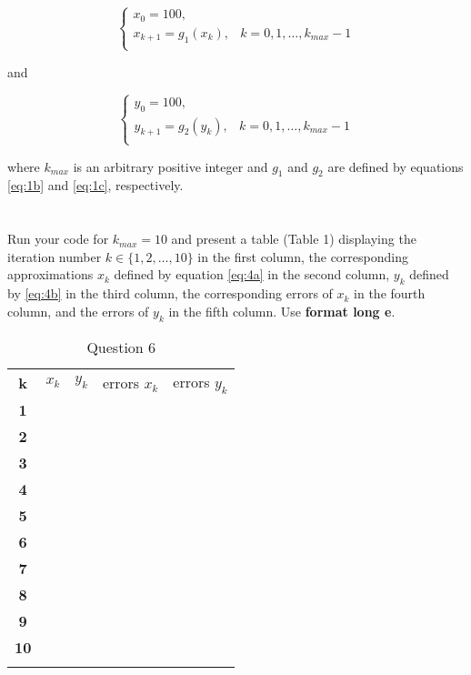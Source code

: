 \documentclass{article}
\begin{document}
\begin{equation}\label{eq:4a}
    \begin{cases}
    x_0 = 100,\\
    x_{k+1}= g_1(x_k), & k=0,1,\dots , k_{max}-1\\
    \end{cases}
\end{equation}

and 

\begin{equation}\label{eq:4b}
    \begin{cases}
    y_0 = 100,\\
    y_{k+1}= g_2(y_k), & k=0,1,\dots , k_{max}-1\\
    \end{cases}
\end{equation}

where $k_{max}$ is an arbitrary positive integer and $g_1$ and $g_2$ are defined by equations \ref{eq:1b} and \ref{eq:1c}, respectively. 

\vspace{10mm}

\section{}
Run your code for $k_{max}=10$ and present a table (Table 1) displaying the iteration number $k \in \{1,2,\dots,10\}$ in the first column, the corresponding approximations $x_k$ defined by equation \ref{eq:4a} in the second column, $y_k$ defined by \ref{eq:4b} in the third column, the corresponding errors of $x_k$ in the fourth column, and the errors of $y_k$ in the fifth column. Use {\selectfont \textbf{format long e}}.
\vspace{10mm}

\begin{table}[H]
    \centering
    \begin{tabular}{|c|c|c|c|c|}
    \Xhline{1 pt}
    \textbf{k} & $x_k$& $y_k$& \makecell{errors\\$x_k $ }  & \makecell{errors \\$y_k$}  \\
    \Xhline{2 pt}
    \textbf{1} && &   &  \\
    \Xhline{1 pt}
    \textbf{2} && &   &  \\
    \Xhline{1 pt}
    \textbf{3} && &   &  \\
    \Xhline{1 pt}
    \textbf{4} && &   &  \\
    \Xhline{1 pt}
    \textbf{5} && &   &  \\
    \Xhline{1 pt}
    \textbf{6} && &   &  \\
    \Xhline{1 pt}
    \textbf{7} && &   &  \\
    \Xhline{1 pt}
    \textbf{8} && &   &  \\
    \Xhline{1 pt}
    \textbf{9} && &   &  \\
     \Xhline{1 pt}
    \textbf{10} && &   &  \\
    \Xhline{1 pt}
    \end{tabular}
    \caption{Question 6}
    \label{tab:my_label}
\end{table}
\end{document}

